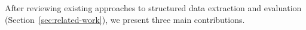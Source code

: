 





After reviewing existing approaches to structured data extraction and evaluation (Section~\ref{sec:related-work}), we present three main contributions.
